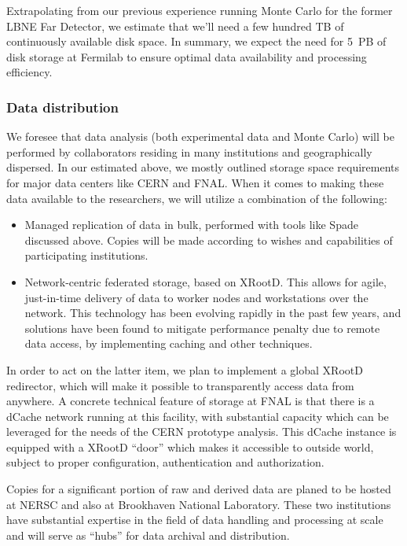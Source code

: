 Extrapolating from our previous experience running Monte Carlo for the former LBNE Far Detector, we estimate that we'll need a few hundred TB of continuously available
disk space. In summary, we expect the need for 5~PB of disk storage at Fermilab to ensure optimal data availability and 
processing efficiency. 

\subsubsection{Data distribution}
We foresee that data analysis (both experimental data and Monte Carlo) will be performed by collaborators residing in many 
institutions and geographically dispersed. In our
estimated above, we mostly outlined storage space requirements for major data centers like CERN and FNAL. When it comes to making these data available to the researchers,
we will utilize a combination of the following:
\begin{itemize}
\item Managed replication of data in bulk, performed with tools like Spade discussed above. Copies will be made according to wishes and capabilities of participating institutions.
\item Network-centric federated storage, based on XRootD. This allows for agile, just-in-time delivery of data to worker nodes and workstations over the network. This
technology has been evolving rapidly in the past few years, and solutions have been found to mitigate performance penalty due to remote data access, by implementing caching
and other techniques.
\end{itemize}

In order to act on the latter item, we plan to implement a global XRootD redirector, which will make it possible to transparently access data from anywhere.
A concrete technical feature of storage at FNAL is that there is a dCache network running at this facility, with substantial capacity which can be leveraged
for the needs of the CERN prototype analysis. This dCache instance is equipped with a XRootD ``door'' which makes it accessible to outside world, subject
to proper configuration, authentication and authorization.


Copies for a significant portion of raw and derived data are planed to be hosted at NERSC and also at Brookhaven National Laboratory.
These two institutions have substantial expertise  in the field of data handling and processing at scale and will serve as ``hubs'' for data archival and distribution.



